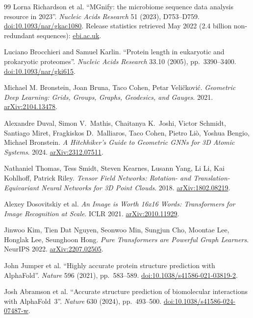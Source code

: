 \documentclass[12pt,a4paper,twoside]{report}
\begin{document}
\begin{thebibliography}{99}
Lorna Richardson et al.
``MGnify: the microbiome sequence data analysis resource in 2023''.
\textit{Nucleic Acids Research} 51 (2023), D753--D759.
\href{https://doi.org/10.1093/nar/gkac1080}{doi:10.1093/nar/gkac1080}.
Release statistics retrieved May 2022 (2.4 billion non-redundant sequences):
\href{https://www.ebi.ac.uk/about/news/updates-from-data-resources/2-4-billion-sequences-now-available-in-the-latest-mgnify-protein-database-release/}{ebi.ac.uk}.

Luciano Brocchieri and Samuel Karlin.
``Protein length in eukaryotic and prokaryotic proteomes''.
\textit{Nucleic Acids Research} 33.10 (2005), pp.~3390--3400.
\href{https://doi.org/10.1093/nar/gki615}{doi:10.1093/nar/gki615}.


Michael M. Bronstein, Joan Bruna, Taco Cohen, Petar Veli\v{c}kovi\'c.
\textit{Geometric Deep Learning: Grids, Groups, Graphs, Geodesics, and Gauges}. 2021.
\href{https://arxiv.org/abs/2104.13478}{arXiv:2104.13478}.

Alexandre Duval, Simon V.~Mathis, Chaitanya K.~Joshi, Victor Schmidt, Santiago Miret, Fragkiskos D.~Malliaros, Taco Cohen, Pietro Li\`o, Yoshua Bengio, Michael Bronstein.
\textit{A Hitchhiker's Guide to Geometric GNNs for 3D Atomic Systems}. 2024.
\href{https://arxiv.org/abs/2312.07511}{arXiv:2312.07511}.

Nathaniel Thomas, Tess Smidt, Steven Kearnes, Lusann Yang, Li Li, Kai Kohlhoff, Patrick Riley.
\textit{Tensor Field Networks: Rotation- and Translation-Equivariant Neural Networks for 3D Point Clouds}. 2018.
\href{https://arxiv.org/abs/1802.08219}{arXiv:1802.08219}.

Alexey Dosovitskiy et al.
\textit{An Image is Worth 16x16 Words: Transformers for Image Recognition at Scale}. ICLR 2021.
\href{https://arxiv.org/abs/2010.11929}{arXiv:2010.11929}.

Jinwoo Kim, Tien Dat Nguyen, Seonwoo Min, Sungjun Cho, Moontae Lee, Honglak Lee, Seunghoon Hong.
\textit{Pure Transformers are Powerful Graph Learners}. NeurIPS 2022.
\href{https://arxiv.org/abs/2207.02505}{arXiv:2207.02505}.

John Jumper et al.
``Highly accurate protein structure prediction with AlphaFold''.
\textit{Nature} 596 (2021), pp.~583--589.
\href{https://doi.org/10.1038/s41586-021-03819-2}{doi:10.1038/s41586-021-03819-2}.

Josh Abramson et al.
``Accurate structure prediction of biomolecular interactions with AlphaFold~3''.
\textit{Nature} 630 (2024), pp.~493--500.
\href{https://doi.org/10.1038/s41586-024-07487-w}{doi:10.1038/s41586-024-07487-w}.


\end{thebibliography}
\end{document}
